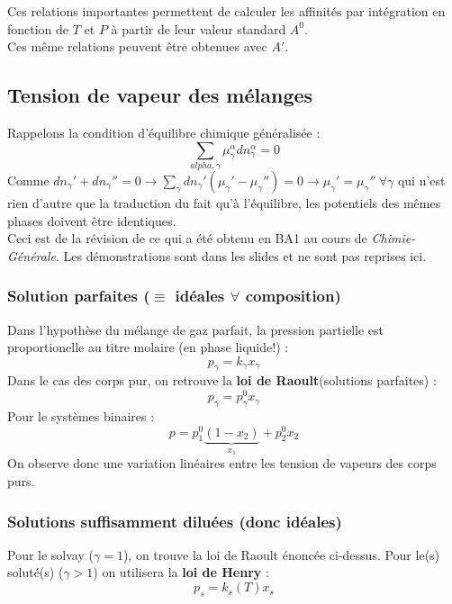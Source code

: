 \documentclass[11pt, a4paper, openany]{book}
\begin{document}
Ces relations importantes permettent de calculer les affinités par intégration en fonction de $T$ et $P$ à partir de leur valeur standard $A^0$.\\

Ces même relations peuvent être obtenues avec $A'$.


\subsection{Tension de vapeur des mélanges}
Rappelons la condition d'équilibre chimique généralisée :
\begin{equation}
\sum_{alpha, \gamma} \mu_\gamma^\alpha dn_\gamma^\alpha = 0
\end{equation}
Comme $dn_\gamma ' + dn_\gamma '' = 0 \rightarrow \sum_\gamma dn_\gamma ' (\mu_\gamma ' - \mu_\gamma '') = 0 \rightarrow \mu_\gamma ' = \mu_\gamma ''\ \forall \gamma$ qui n'est rien d'autre que la traduction du fait qu'à l'équilibre, les potentiels des mêmes phases doivent être identiques.\\

Ceci est de la révision de ce qui a été obtenu en BA1 au cours de \textit{Chimie-Générale}. Les démonstrations sont dans les slides et ne sont pas reprises ici.
\subsubsection{Solution parfaites ($\equiv$ idéales $\forall$ composition)}
Dans l'hypothèse du mélange de gaz parfait, la pression partielle est proportionelle au titre molaire (en phase liquide!) :
\begin{equation}
p_\gamma = k_\gamma x_\gamma
\end{equation}
Dans le cas des corps pur, on retrouve la \textbf{loi de Raoult}(solutions parfaites) : 
\begin{equation}
p_\gamma = p^0_\gamma x_\gamma
\end{equation}
Pour le systèmes binaires : 
\begin{equation}
p = p^0_1\underbrace{(1-x_2)}_{x_1} + p_2^0x_2
\end{equation}
On observe donc une variation linéaires entre les tension de vapeurs des corps purs.

\subsubsection{Solutions suffisamment diluées (donc idéales)}
Pour le solvay ($\gamma = 1$), on trouve la loi de Raoult énoncée ci-dessus. Pour le(s) soluté(s) ($\gamma > 1$) on utilisera la \textbf{loi de Henry} :
\begin{equation}
p_s = k_s(T)x_s
\end{equation}
\end{document}
